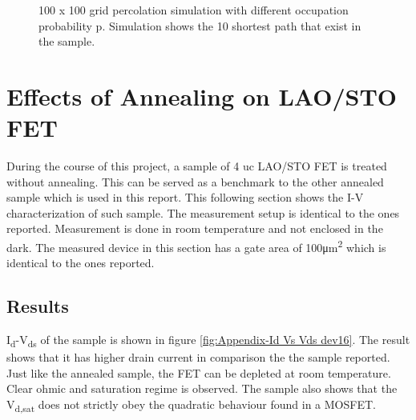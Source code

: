 \documentclass[11pt,a4paper]{report}
\begin{document}
\begin{figure}[!ht]
\hfil
\caption{100 x 100 grid percolation simulation with different occupation probability p. Simulation shows the 10 shortest path that exist in the sample.}
\label{fig:sample_visualized}
\end{figure}

\chapter{Effects of Annealing on LAO/STO FET}\label{section:annealing appendix}
During the course of this project, a sample of 4 uc LAO/STO FET is treated without annealing. This can be served as a benchmark to the other annealed sample which is used in this report. This following section shows the I-V characterization of such sample. The measurement setup is identical to the ones reported. Measurement is done in room temperature and not enclosed in the dark. The measured device in this section has a gate area of 100\si{\micro m^{2}} which is identical to the ones reported.

\section{Results}
I\textsubscript{d}-V\textsubscript{ds} of the sample is shown in figure \ref{fig:Appendix-Id Vs Vds dev16}. The result shows that it has higher drain current in comparison the the sample reported. Just like the annealed sample, the FET can be depleted at room temperature. Clear ohmic and saturation regime is observed. The sample also shows that the V\textsubscript{d,sat} does not strictly obey the quadratic behaviour found in a MOSFET. 
\end{document}
